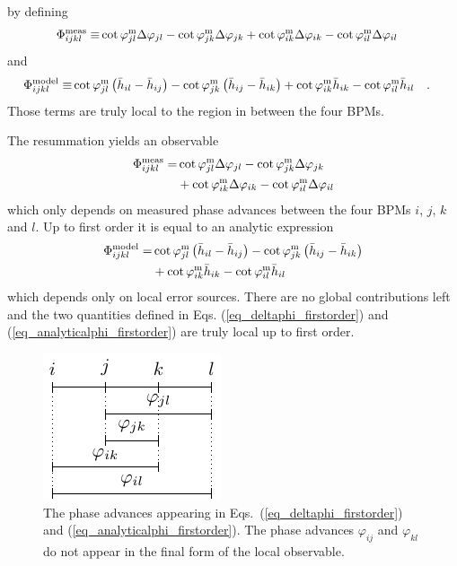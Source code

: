 by defining
\begin{align}
  \Phi^{\mathrm{meas}}_{ijkl} \equiv&
  \cot\varphi_{jl}^\text{m}\Delta\varphi_{jl} - \cot\varphi_{jk}^\text{m}\Delta\varphi_{jk}
  + \cot\varphi_{ik}^\text{m}\Delta\varphi_{ik} - \cot\varphi_{il}^\text{m}\Delta\varphi_{il} 
  \label{eq_deltaphi_firstorder_app}
\end{align}
and
\begin{align}
  \Phi_{ijkl}^\text{model} \equiv&
  \cot\varphi_{jl}^\text{m}\left(\bar{h}_{il} - \bar{h}_{ij}\right) 
  -\cot\varphi_{jk}^\text{m}\left( \bar{h}_{ij} - \bar{h}_{ik} \right)
  + \cot\varphi_{ik}^\text{m} \bar{h}_{ik} - \cot\varphi_{il}^\text{m}\bar{h}_{il}
  \quad .
  \label{eq_analyticalphi_firstorder_app}
\end{align}
Those terms are truly local to the region in between the four BPMs.


The resummation yields an observable
\begin{align}
  \Phi^{\mathrm{meas}}_{ijkl} =&
  \cot\varphi_{jl}^\text{m}\Delta\varphi_{jl} - \cot\varphi_{jk}^\text{m}\Delta\varphi_{jk} \notag \\
  &+ \cot\varphi_{ik}^\text{m}\Delta\varphi_{ik} - \cot\varphi_{il}^\text{m}\Delta\varphi_{il} 
  \label{eq_deltaphi_firstorder}
\end{align}
which only depends on measured phase advances between the four BPMs $i$, $j$, $k$ and $l$.
Up to first order it is equal to an analytic expression
\begin{align}
  \Phi_{ijkl}^\text{model} =&
  \cot\varphi_{jl}^\text{m}\left(\bar{h}_{il} - \bar{h}_{ij}\right) 
  -\cot\varphi_{jk}^\text{m}\left( \bar{h}_{ij} - \bar{h}_{ik} \right) \notag \\
  &+ \cot\varphi_{ik}^\text{m} \bar{h}_{ik} - \cot\varphi_{il}^\text{m}\bar{h}_{il}
  \label{eq_analyticalphi_firstorder}
\end{align}
which depends only on local error sources.
There are no global contributions left and the two quantities defined in Eqs. (\ref{eq_deltaphi_firstorder}) and 
(\ref{eq_analyticalphi_firstorder}) are truly local up to first order.

\begin{figure}
  \centering
  \includegraphics[width=.3\linewidth]{figThetaComb}
\caption{
  The phase advances appearing in Eqs.~(\ref{eq_deltaphi_firstorder}) and (\ref{eq_analyticalphi_firstorder}).
  The phase advances $\varphi_{ij}$ and $\varphi_{kl}$ do not appear in the final form of the local
  observable.
}
  \label{fig_thetacomb}
\end{figure}

